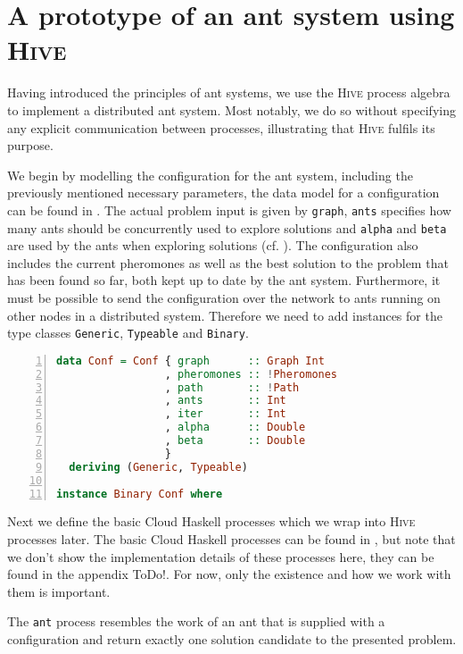 \section{A prototype of an ant system using \textsc{Hive}}
Having introduced the principles of ant systems, we use the \textsc{Hive} process algebra to implement a distributed ant system. Most notably, we do so without specifying any explicit communication between processes, illustrating that \textsc{Hive} fulfils its purpose.

We begin by modelling the configuration for the ant system, including the previously mentioned necessary parameters, the data model for a configuration can be found in . The actual problem input is given by \texttt{graph}, \texttt{ants} specifies how many ants should be concurrently used to explore solutions and \texttt{alpha} and \texttt{beta} are used by the ants when exploring solutions (cf. ). The configuration also includes the current pheromones as well as the best solution to the problem that has been found so far, both kept up to date by the ant system. Furthermore, it must be possible to send the configuration over the network to ants running on other nodes in a distributed system. Therefore we need to add instances for the type classes \texttt{Generic}, \texttt{Typeable} and \texttt{Binary}.

\begin{lstlisting}[language=Haskell,frame=tb,numbers=left,label=lst:ant_conf,caption=Configuration for the ant system.]
data Conf = Conf { graph      :: Graph Int
                 , pheromones :: !Pheromones
                 , path       :: !Path
                 , ants       :: Int
                 , iter       :: Int
                 , alpha      :: Double
                 , beta       :: Double
                 }
  deriving (Generic, Typeable)

instance Binary Conf where
\end{lstlisting}

Next we define the basic \textsf{Cloud Haskell} processes which we wrap into \textsc{Hive} processes later. The basic \textsf{Cloud Haskell} processes can be found in , but note that we don't show the implementation details of these processes here, they can be found in the appendix ToDo!. For now, only the existence and how we work with them is important.

The \texttt{ant} process resembles the work of an ant that is supplied with a configuration and return exactly one solution candidate to the presented problem.

